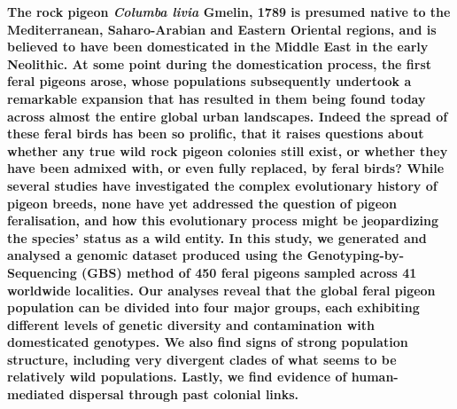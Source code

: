 \documentclass[twoside, british, a4paper]{article}
\begin{document}
\noindent \textbf{The rock pigeon \textit{Columba livia} Gmelin, 1789 is presumed native to the Mediterranean, Saharo-Arabian and Eastern Oriental regions, and is believed to have been domesticated in the Middle East in the early Neolithic. At some point during the domestication process, the first feral pigeons arose, whose populations subsequently undertook a remarkable expansion that has resulted in them being found today across almost the entire global urban landscapes. Indeed the spread of these feral birds has been so prolific, that it raises questions about whether any true wild rock pigeon colonies still exist, or whether they have been admixed with, or even fully replaced, by feral birds? While several studies have investigated the complex evolutionary history of pigeon breeds, none have yet addressed the question of pigeon feralisation, and how this evolutionary process might be jeopardizing the species’ status as a wild entity. In this study, we generated and analysed a genomic dataset produced using the Genotyping-by-Sequencing (GBS) method of 450 feral pigeons sampled across 41 worldwide localities. Our analyses reveal that the global feral pigeon population can be divided into four major groups, each exhibiting different levels of genetic diversity and contamination with domesticated genotypes. We also find signs of strong population structure, including very divergent clades of what seems to be relatively wild populations. Lastly, we find evidence of human-mediated dispersal through past colonial links.} \

\hfill\break

\end{document}
